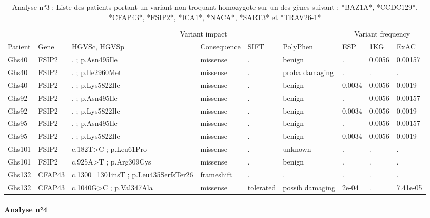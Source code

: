 \documentclass[12pt,twoside]{reedthesis}
\theoremstyle{definition}
\theoremstyle{definition}
\theoremstyle{remark}
\begin{document}
  \begin{landscape}
  \begin{longtable}[t]{llp{11em}llllll}
  \caption{\label{tab:tabgrp2low}Analyse n°3 : Liste des patients portant un variant non troquant homozygote sur un des gènes suivant : *BAZ1A*, *CCDC129*, *CFAP43*, *FSIP2*, *ICA1*, *NACA*, *SART3*  et  *TRAV26-1*}\\
  \toprule
  \multicolumn{1}{c}{ } & \multicolumn{1}{c}{ } & \multicolumn{4}{c}{Variant impact} & \multicolumn{3}{c}{Variant frequency} \\
  \cmidrule(l{2pt}r{2pt}){3-6} \cmidrule(l{2pt}r{2pt}){7-9}
  Patient & Gene & HGVSc, HGVSp & Consequence & SIFT & PolyPhen & ESP & 1KG & ExAC\\
  \midrule
  Ghs40 & FSIP2 & . ; p.Asn495Ile & missense & . & benign & . & 0.0056 & 0.00157\\
  Ghs40 & FSIP2 & . ; p.Ile2960Met & missense & . & proba damaging & . & . & .\\
  Ghs40 & FSIP2 & . ; p.Lys5822Ile & missense & . & benign & 0.0034 & 0.0056 & 0.0019\\
  Ghs92 & FSIP2 & . ; p.Asn495Ile & missense & . & benign & . & 0.0056 & 0.00157\\
  Ghs92 & FSIP2 & . ; p.Lys5822Ile & missense & . & benign & 0.0034 & 0.0056 & 0.0019\\
  \addlinespace
  Ghs95 & FSIP2 & . ; p.Asn495Ile & missense & . & benign & . & 0.0056 & 0.00157\\
  Ghs95 & FSIP2 & . ; p.Lys5822Ile & missense & . & benign & 0.0034 & 0.0056 & 0.0019\\
  Ghs101 & FSIP2 & c.182T>C ; p.Leu61Pro & missense & . & unknown & . & . & .\\
  Ghs101 & FSIP2 & c.925A>T ; p.Arg309Cys & missense & . & benign & . & . & .\\
  Ghs132 & CFAP43 & c.1300\_1301insT ; p.Leu435SerfsTer26 & frameshift & . & . & . & . & .\\
  Ghs132 & CFAP43 & c.1040G>C ; p.Val347Ala & missense & tolerated & possib damaging & 2e-04 & . & 7.41e-05\\
  \bottomrule
  \end{longtable}
  \end{landscape}
  
  \newpage
  
  \paragraph{Analyse n°4}\label{analyse-n4}
  
\end{document}
